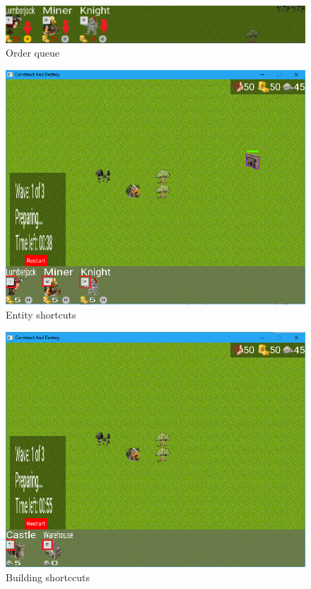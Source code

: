 \begin{figure}[!htb]
    \centering
    \includegraphics[scale=0.8]{res/unit-panel-order-queue.png}
    \caption{Order queue}\label{fig:unit-panel-order-queue}
\end{figure}

\begin{figure}[!htb]
    \centering
    \includegraphics[scale=0.6]{res/entity-shortcuts.png}
    \caption{Entity shortcuts}\label{fig:entity-shortcuts}
\end{figure}

\begin{figure}[!htb]
    \centering
    \includegraphics[scale=0.6]{res/building-shortcuts.png}
    \caption{Building shortccuts}\label{fig:entity-shortcuts}
\end{figure}


